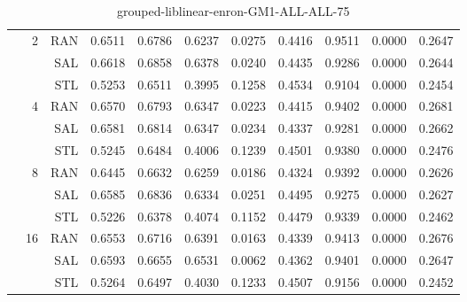 \begin{center}
\begin{table}[htbp]
\begin{center}
\begin{tabular}{ | r | r | r | r | r | r | r | r | r | r | r |}
 & \multirow{3}{*}{2} & RAN & 0.6511 & 0.6786 & 0.6237 & 0.0275 & 0.4416 & 0.9511 & 0.0000 & 0.2647\\ \cline{3-11}
 &   & SAL & 0.6618 & 0.6858 & 0.6378 & 0.0240 & 0.4435 & 0.9286 & 0.0000 & 0.2644\\ \cline{3-11}
 &   & STL & 0.5253 & 0.6511 & 0.3995 & 0.1258 & 0.4534 & 0.9104 & 0.0000 & 0.2454\\ \cline{2-11}
 & \multirow{3}{*}{4} & RAN & 0.6570 & 0.6793 & 0.6347 & 0.0223 & 0.4415 & 0.9402 & 0.0000 & 0.2681\\ \cline{3-11}
 &   & SAL & 0.6581 & 0.6814 & 0.6347 & 0.0234 & 0.4337 & 0.9281 & 0.0000 & 0.2662\\ \cline{3-11}
 &   & STL & 0.5245 & 0.6484 & 0.4006 & 0.1239 & 0.4501 & 0.9380 & 0.0000 & 0.2476\\ \cline{2-11}
 & \multirow{3}{*}{8} & RAN & 0.6445 & 0.6632 & 0.6259 & 0.0186 & 0.4324 & 0.9392 & 0.0000 & 0.2626\\ \cline{3-11}
 &   & SAL & 0.6585 & 0.6836 & 0.6334 & 0.0251 & 0.4495 & 0.9275 & 0.0000 & 0.2627\\ \cline{3-11}
 &   & STL & 0.5226 & 0.6378 & 0.4074 & 0.1152 & 0.4479 & 0.9339 & 0.0000 & 0.2462\\ \cline{2-11}
 & \multirow{3}{*}{16} & RAN & 0.6553 & 0.6716 & 0.6391 & 0.0163 & 0.4339 & 0.9413 & 0.0000 & 0.2676\\ \cline{3-11}
 &   & SAL & 0.6593 & 0.6655 & 0.6531 & 0.0062 & 0.4362 & 0.9401 & 0.0000 & 0.2647\\ \cline{3-11}
 &   & STL & 0.5264 & 0.6497 & 0.4030 & 0.1233 & 0.4507 & 0.9156 & 0.0000 & 0.2452\\ \cline{2-11}
\hline
\end{tabular}
\caption{grouped-liblinear-enron-GM1-ALL-ALL-75}
\end{center}
 \end{table}
\end{center}


